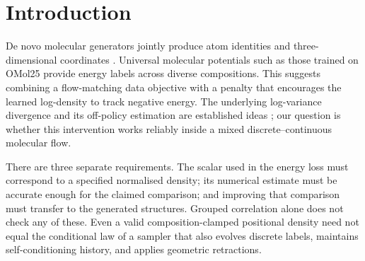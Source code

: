 \begin{abstract}
Energy values from universal molecular potentials offer an auxiliary training signal for bond-free
3D generators, but an improvement in a density-based diagnostic need not establish improved sampling.
We study group-wise log-variance regularisation of a FlowMol3 backbone trained on OMol25.
The archived implementation improves a local scalar-readout correlation with independent GFN2-xTB
energies from $0.200$ to $0.369$ on $93$ filtered held-out parents, and top-1 retrieval from
$20.2\%$ to $29.6\%$. An implementation audit finds that this readout integrates the network's
endpoint prediction as a velocity and omits trajectory and prior gradients; it is therefore not a
validated likelihood of the generator. On a fixed-checkpoint, fixed-geometry resolution sweep, the
value-minus-FM correlation gap decreases from $0.175$ at $12$ steps to $0.042$ at $48$ steps.
An independent generation-strain evaluation provides no evidence of improved sample quality, and raw
energy calibration does not improve. We distinguish these observations from the ideal grouped
objective's identifiability properties, provide a corrected clamped-flow implementation with analytic
and interface tests, and specify the remaining experiments needed to establish a sampling claim.
\end{abstract}

\section{Introduction}
\label{sec:intro}

De novo molecular generators jointly produce atom identities and three-dimensional coordinates
\citep{edm,geoldm,semlaflow,flowmol3}. Universal molecular potentials such as those trained on OMol25
\citep{omol25,esen} provide energy labels across diverse compositions. This suggests combining a
flow-matching data objective with a penalty that encourages the learned log-density to track negative
energy. The underlying log-variance divergence and its off-policy estimation are established ideas
\citep{vargrad,nusken2021pathspace,richter2024improvedsampling,sendera2024offpolicy,ldr2026}; our
question is whether this intervention works reliably inside a mixed discrete--continuous molecular
flow.

There are three separate requirements. The scalar used in the energy loss must correspond to a
specified normalised density; its numerical estimate must be accurate enough for the claimed
comparison; and improving that comparison must transfer to the generated structures. Grouped
correlation alone does not check any of these. Even a valid composition-clamped positional density
need not equal the conditional law of a sampler that also evolves discrete labels, maintains
self-conditioning history, and applies geometric retractions.

